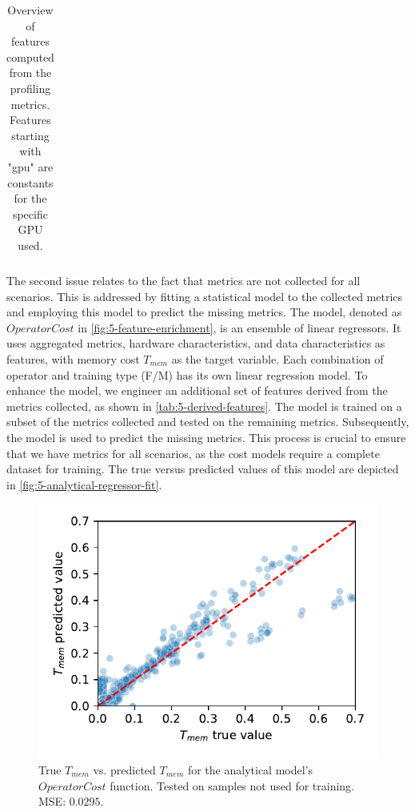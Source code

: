 \begin{table}[ht]
\begin{tabular}{p{0.19\linewidth}p{0.37\linewidth}>{\footnotesize}p{0.35\linewidth}}
    \bottomrule
  \end{tabular}
  \caption[Derived features]{Overview of features computed from the profiling metrics. Features starting with "gpu" are constants for the specific GPU used.}
  \label{tab:5-derived-features}
\end{table}

The second issue relates to the fact that metrics are not collected for all scenarios. This is addressed by fitting a statistical model to the collected metrics and employing this model to predict the missing metrics. The model, denoted as $OperatorCost$ in \autoref{fig:5-feature-enrichment}, is an ensemble of linear regressors. It uses aggregated metrics, hardware characteristics, and data characteristics as features, with memory cost $T_{mem}$ as the target variable. Each combination of operator and training type (F/M) has its own linear regression model.
To enhance the model, we engineer an additional set of features derived from the metrics collected, as shown in \autoref{tab:5-derived-features}.
The model is trained on a subset of the metrics collected and tested on the remaining metrics. Subsequently, the model is used to predict the missing metrics. This process is crucial to ensure that we have metrics for all scenarios, as the cost models require a complete dataset for training. The true versus predicted values of this model are depicted in \autoref{fig:5-analytical-regressor-fit}.

\begin{figure}[ht]
  \centering
  \includegraphics[width=0.5\linewidth]{chapters/05_cost_estimation/figures/analytical-regressor-fit.pdf}
  \caption[Analytical model memory cost prediction vs. true values]{True $T_{mem}$ vs. predicted $T_{mem}$ for the analytical model's $OperatorCost$ function. Tested on samples not used for training. MSE: $0.0295$.}
  \label{fig:5-analytical-regressor-fit}
\end{figure}

